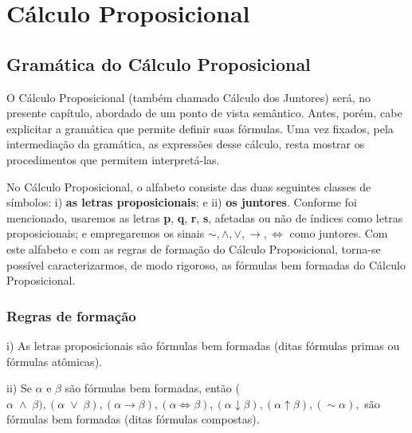 
\chapter{Cálculo Proposicional}

\section{Gramática do Cálculo Proposicional}

O Cálculo Proposicional (também chamado Cálculo dos Juntores) será, no presente capítulo, abordado de um ponto de vista semântico.
Antes, porém, cabe explicitar a gramática que permite definir suas fórmulas.
Uma vez fixados, pela intermediação da gramática, as expressões desse cálculo, resta mostrar os procedimentos que permitem interpretá-las.

No Cálculo Proposicional, o alfabeto consiste das duas seguintes classes de símbolos: i) \textbf{as letras proposicionais}; e ii) \textbf{os juntores}.
Conforme foi mencionado, usaremos as letras \textbf{p}, \textbf{q}, \textbf{r}, \textbf{s}, afetadas ou não de índices como letras proposicionais; e empregaremos os sinais $\sim, \wedge, \vee, \to, \iff$ como juntores.
Com este alfabeto e com as regras de formação do Cálculo Proposicional, torna-se possível caracterizarmos, de modo rigoroso, as fórmulas bem formadas do Cálculo Proposicional.

\subsection*{Regras de formação}

\noindent i) As letras proposicionais são fórmulas bem formadas (ditas fórmulas primas ou fórmulas atômicas).

\bigskip

\noindent ii) Se $\alpha$ e $\beta$ são fórmulas bem formadas, então ($\alpha \; \land \; \beta), (\alpha \; \vee \; \beta), (\alpha \to \beta), (\alpha \iff \beta), (\alpha \downarrow \beta), (\alpha \uparrow \beta), (\sim\alpha),$ são fórmulas bem formadas (ditas fórmulas compostas).
